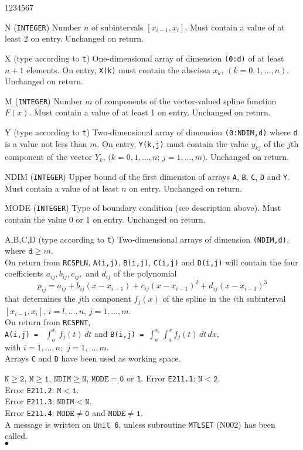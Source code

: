 \begin{DLtt}{1234567}
\item[N]({\tt INTEGER}) Number $n$ of subintervals $[x_{i-1}, x_{i}]$.
Must contain a value of at least 2 on entry.  Unchanged on return.
\item[X] (type according to {\tt t}) One-dimensional array of
dimension {\tt (0:d)} of at least $n + 1$ elements.
On entry, {\tt X(k)} must contain the abscissa $x_{k}$,
$(k=0,1,\ldots,n)$. Unchanged on return.
\item[M] ({\tt INTEGER}) Number $m$ of components of the vector-valued
spline function $F(x)$.
Must contain a value of at least 1 on entry. Unchanged on return.
\item[Y] (type according to {\tt t}) Two-dimensional array of
dimension {\tt (0:NDIM,d)} where {\tt d} is a value not less than $m$.
On entry, {\tt Y(k,j)} must contain the value $y_{kj}$ of the
$j$th component of the vector $Y_k$, $(k=0,1,\ldots,n$; $j=1,\ldots,m)$.
Unchanged on return.
\item[NDIM] ({\tt INTEGER}) Upper bound of the first dimension of arrays
{\tt A}, {\tt B}, {\tt C}, {\tt D} and {\tt Y}.
Must contain a value of at least $n$ on entry. Unchanged on return.
\item[MODE]
({\tt INTEGER}) Type of boundary condition (see description above).
Must contain the value 0 or 1 on entry. Unchanged on return.
\item[A,B,C,D] (type according to {\tt t}) Two-dimensional arrays of
dimension {\tt(NDIM,d)}, where $\mathtt{d}\ge m$.\\
On return from {\tt RCSPLN}, {\tt A(i,j)}, {\tt B(i,j)}, {\tt C(i,j)}
and {\tt D(i,j)} will contain
the four coefficients $a_{ij}, b_{ij}, c_{ij},$ and $d_{ij}$ of the
polynomial
$$p_{ij} = a_{ij} + b_{ij} (x - x_{i-1}) + c_{ij}(x - x_{i-1})^{2}
+ d_{ij}(x - x_{i-1})^{3}$$
that determines the $j$th component $f_{j}(x)$ of the spline in the $i$th
subinterval $[x_{i-1}, x_{i}]$, $i=l,\ldots,n$, $j=1,\ldots,m$.\\
On return from {\tt RCSPNT}, \\ [3mm]
{\tt A(i,j) = } $\displaystyle
\int^{x_i}_a f_{j} (t)\, dt$ \quad and \quad
{\tt B(i,j) = }$\displaystyle
\int^{x_i}_a\!\int^{x}_a f_{j} (t)\,dt\,dx$, \\[3mm]
with $i=1,\dots,n;$ $j=1,\ldots,m$.\\
Arrays {\tt C} and {\tt D} have been used as working space.
\end{DLtt}
\Restrict
$\mathtt{N \ge 2}$, $\mathtt{M \ge 1}$, $\mathtt{NDIM \ge N}$,
$\mathtt{MODE = 0}$ or {\tt 1}.
\Errorh
Error {\tt E211.1}: $\mathtt{N<2}$. \\
Error {\tt E211.2}: $\mathtt{M<1}$. \\
Error {\tt E211.3}: $\mathtt{NDIM<N}$. \\
Error {\tt E211.4}: $\mathtt{MODE \ne 0}$ and $\mathtt{MODE \ne 1}$. \\
A message is written on {\tt Unit 6}, unless subroutine {\tt MTLSET}
(N002) has been called.
\\ $\bullet$
